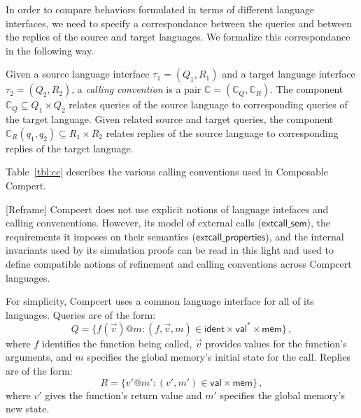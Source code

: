 \documentclass[sigplan,10pt,review,anonymous]{acmart}
\newcommand{\kw}[1]{\ensuremath{ \textsf{#1} }}
\begin{document}
In order to compare behaviors formulated in terms of
different language interfaces,
we need to specify a correspondance
between the queries and between the replies
of the source and target languages.
We formalize this correspondance in the following way.

\begin{definition}
Given a source language interface $\tau_1 = (Q_1, R_1)$ and
a target language interface $\tau_2 = (Q_2, R_2)$,
a \emph{calling convention} is a pair
$\mathbb{C} = (\mathbb{C}_Q, \mathbb{C}_R)$.
The component
$\mathbb{C}_Q \subseteq Q_1 \times Q_2$
relates queries of the source language to
corresponding queries of the target language.
Given related source and target queries,
the component
$\mathbb{C}_R(q_1, q_2) \subseteq R_1 \times R_2$
relates replies of the source language to
corresponding replies of the target language.
\end{definition}

Table~\ref{tbl:cc} describes the various calling conventions
used in Composable Compert.

[Reframe] Compcert does not use explicit notions of
language intefaces and calling convenentions.
However,
its model of external calls
(\kw{extcall\_sem}),
the requirements it imposes on their semantics
(\kw{extcall\_properties}),
and the internal invariants used by its simulation proofs
can be read in this light
and used to define
compatible notions of refinement and calling conventions
across Compcert languages.

For simplicity,
Compcert uses a common language interface
for all of its languages.
Queries are of the form:
\[
  Q = \{ f(\vec{v})@m : (f, \vec{v}, m) \in
    \kw{ident} \times \kw{val}^* \times \kw{mem} \} \,,
\]
where $f$ identifies the function being called,
$\vec{v}$ provides values for the function's arguments, and
$m$ specifies the global memory's initial state for the call.
Replies are of the form:
\[
  R = \{ v'@m' : (v', m') \in
    \kw{val} \times \kw{mem} \} \,,
\]
where $v'$ gives the function's return value and
$m'$ specifies the global memory's new state.
\end{document}
